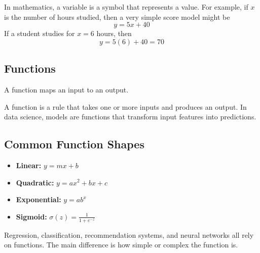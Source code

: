 \documentclass[11pt,a4paper]{article}
\begin{document}
In mathematics, a variable is a symbol that represents a value. For example, if $x$ is the number of hours studied, then a very simple score model might be
\[
y = 5x + 40
\]
If a student studies for $x = 6$ hours, then
\[
y = 5(6) + 40 = 70
\]

\subsection{Functions}

A function maps an input to an output.

\begin{definitionbox}[Function]
A function is a rule that takes one or more inputs and produces an output. In data science, models are functions that transform input features into predictions.
\end{definitionbox}

\begin{center}
\end{center}

\subsection{Common Function Shapes}

\begin{itemize}[leftmargin=*]
  \item \textbf{Linear:} $y = mx + b$
  \item \textbf{Quadratic:} $y = ax^2 + bx + c$
  \item \textbf{Exponential:} $y = ab^x$
  \item \textbf{Sigmoid:} $\sigma(z) = \frac{1}{1 + e^{-z}}$
\end{itemize}

\begin{conceptbox}
Regression, classification, recommendation systems, and neural networks all rely on functions. The main difference is how simple or complex the function is.
\end{conceptbox}
\end{document}
